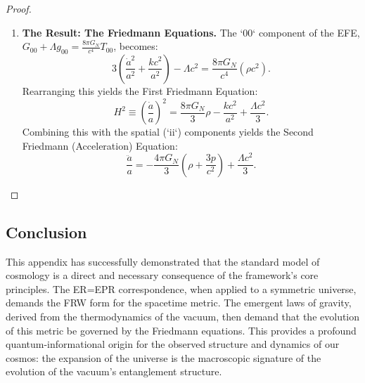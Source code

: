\documentclass[11pt, letterpaper]{report}
\theoremstyle{plain} %
\theoremstyle{definition} %
\theoremstyle{remark} %
\begin{document}
\begin{proof}
\begin{enumerate}
    \item \textbf{The Result: The Friedmann Equations.}
    The `00` component of the EFE, $G_{00} + \Lambda g_{00} = \frac{8\pi G_N}{c^4}T_{00}$, becomes:
    \begin{equation}
        3\left( \frac{\dot{a}^2}{a^2} + \frac{kc^2}{a^2} \right) - \Lambda c^2 = \frac{8\pi G_N}{c^4} (\rho c^2).
    \end{equation}
    Rearranging this yields the First Friedmann Equation:
    \begin{equation}
        \boxed{H^2 \equiv \left(\frac{\dot{a}}{a}\right)^2 = \frac{8\pi G_N}{3}\rho - \frac{kc^2}{a^2} + \frac{\Lambda c^2}{3}.}
    \end{equation}
    Combining this with the spatial (`ii`) components yields the Second Friedmann (Acceleration) Equation:
    \begin{equation}
        \boxed{\frac{\ddot{a}}{a} = -\frac{4\pi G_N}{3}\left(\rho + \frac{3p}{c^2}\right) + \frac{\Lambda c^2}{3}.}
    \end{equation}
\end{enumerate}
\end{proof}

\subsection{Conclusion}

This appendix has successfully demonstrated that the standard model of cosmology is a direct and necessary consequence of the framework's core principles. The ER=EPR correspondence, when applied to a symmetric universe, demands the FRW form for the spacetime metric. The emergent laws of gravity, derived from the thermodynamics of the vacuum, then demand that the evolution of this metric be governed by the Friedmann equations. This provides a profound quantum-informational origin for the observed structure and dynamics of our cosmos: the expansion of the universe is the macroscopic signature of the evolution of the vacuum's entanglement structure.
\end{document}
